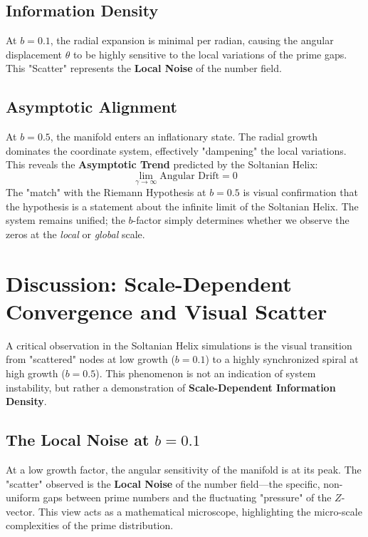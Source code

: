 \documentclass[11pt,a4paper]{article}
\begin{document}
\subsection{Information Density}
At $b=0.1$, the radial expansion is minimal per radian, causing the angular displacement $\theta$ to be highly sensitive to the local variations of the prime gaps. This "Scatter" represents the \textbf{Local Noise} of the number field. 

\subsection{Asymptotic Alignment}
At $b=0.5$, the manifold enters an inflationary state. The radial growth dominates the coordinate system, effectively "dampening" the local variations. This reveals the \textbf{Asymptotic Trend} predicted by the Soltanian Helix:
\begin{equation}
    \lim_{\gamma \to \infty} \text{Angular Drift} = 0
\end{equation}
The "match" with the Riemann Hypothesis at $b=0.5$ is visual confirmation that the hypothesis is a statement about the infinite limit of the Soltanian Helix. The system remains unified; the $b$-factor simply determines whether we observe the zeros at the \textit{local} or \textit{global} scale.

\section{Discussion: Scale-Dependent Convergence and Visual Scatter}

A critical observation in the Soltanian Helix simulations is the visual transition from "scattered" nodes at low growth ($b=0.1$) to a highly synchronized spiral at high growth ($b=0.5$). This phenomenon is not an indication of system instability, but rather a demonstration of \textbf{Scale-Dependent Information Density}.

\subsection{The Local Noise at $b=0.1$}
At a low growth factor, the angular sensitivity of the manifold is at its peak. The "scatter" observed is the \textbf{Local Noise} of the number field—the specific, non-uniform gaps between prime numbers and the fluctuating "pressure" of the $Z$-vector. This view acts as a mathematical microscope, highlighting the micro-scale complexities of the prime distribution.
\end{document}
